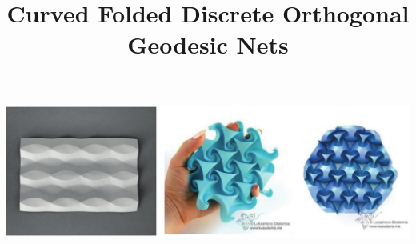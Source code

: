 \documentclass[acmtog,anonymous,review]{acmart}
\begin{document}
\title{Curved Folded Discrete Orthogonal Geodesic Nets}


\begin{teaserfigure}
  \centering
  \includegraphics[width=\linewidth]{figures/curved_wallpapers}
  \caption{\label{fig:curved_wallpapers_teaser} 
}
\end{teaserfigure}
\begin{abstract}

\end{abstract}
\end{document}
